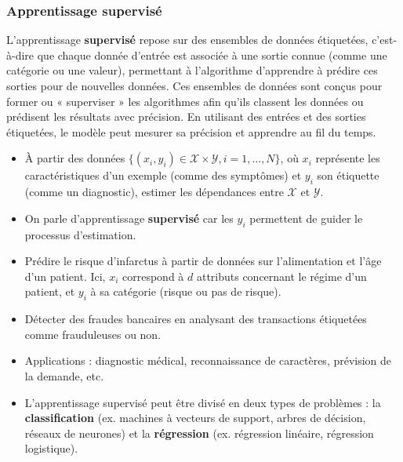 \documentclass[a4paper,12pt]{article}
\begin{document}
        \subsubsection{Apprentissage supervisé}
        
        L'apprentissage \textbf{supervisé} repose sur des ensembles de données étiquetées, c’est-à-dire que chaque donnée d’entrée est associée à une sortie connue (comme une catégorie ou une valeur), permettant à l’algorithme d’apprendre à prédire ces sorties pour de nouvelles données. Ces ensembles de données sont conçus pour former ou « superviser » les algorithmes afin qu'ils classent les données ou prédisent les résultats avec précision. En utilisant des entrées et des sorties étiquetées, le modèle peut mesurer sa précision et apprendre au fil du temps.
        
        
        \begin{itemize}
            \item  À partir des données \(\{(x_i, y_i) \in \mathcal{X} \times \mathcal{Y}, i = 1, \ldots, N\}\), où \(x_i\) représente les caractéristiques d’un exemple (comme des symptômes) et \(y_i\) son étiquette (comme un diagnostic), estimer les dépendances entre \(\mathcal{X}\) et \(\mathcal{Y}\).
            \item  On parle d'apprentissage \textbf{supervisé} car les \(y_i\) permettent de guider le processus d’estimation.
        \end{itemize}
        
        
        \begin{itemize}
            \item  Prédire le risque d’infarctus à partir de données sur l’alimentation et l’âge d’un patient. Ici, \(x_i\) correspond à \(d\) attributs concernant le régime d’un patient, et \(y_i\) à sa catégorie (risque ou pas de risque).
            \item  Détecter des fraudes bancaires en analysant des transactions étiquetées comme frauduleuses ou non.
            \item  Applications : diagnostic médical, reconnaissance de caractères, prévision de la demande, etc.
        \end{itemize}
        
        
        \begin{itemize}
            \item L'apprentissage supervisé peut être divisé en deux types de problèmes : la \textbf{classification} (ex. machines à vecteurs de support, arbres de décision, réseaux de neurones) et la \textbf{régression} (ex. régression linéaire, régression logistique).
        \end{itemize}
        
\end{document}
